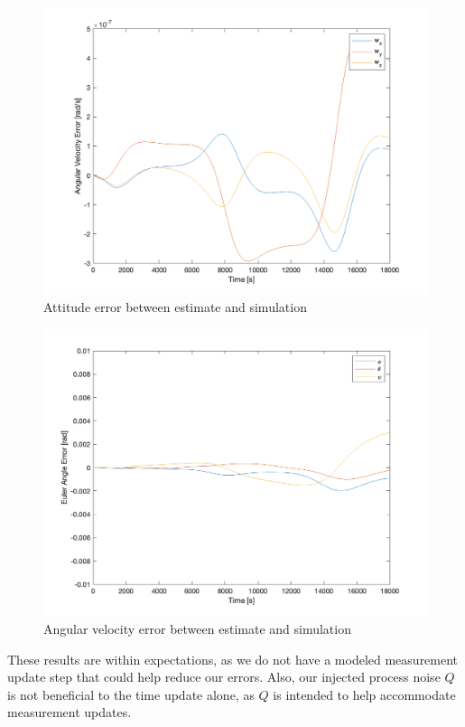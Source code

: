 \begin{figure}[H]
\centering
\includegraphics[scale=0.6]{Images/ps7_problem6_angvel_err.png}
\caption{Attitude error between estimate and simulation}
\label{fig:ps7_problem6_angvel_err}
\end{figure}

\begin{figure}[H]
\centering
\includegraphics[scale=0.6]{Images/ps7_problem6_angle_err.png}
\caption{Angular velocity error between estimate and simulation}
\label{fig:ps7_problem6_angle_err}
\end{figure}

These results are within expectations, as we do not have a modeled measurement update step that could help reduce our errors. Also, our injected process noise $Q$ is not beneficial to the time update alone, as $Q$ is intended to help accommodate measurement updates.

